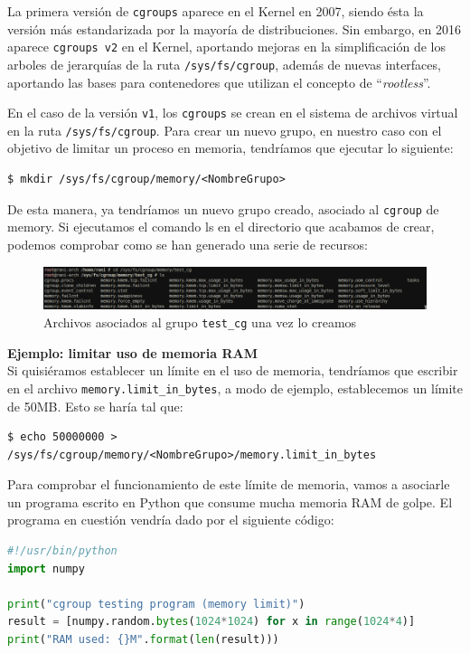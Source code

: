 \documentclass[a4paper, oneside, 12pt]{book}
\begin{document}
	\noindent La primera versión de \texttt{cgroups} aparece en el Kernel en 2007, siendo ésta la versión más estandarizada por la mayoría de distribuciones. Sin embargo, en 2016 aparece \texttt{cgroups v2} en el Kernel, aportando mejoras en la simplificación de los arboles de jerarquías de la ruta \texttt{/sys/fs/cgroup}, además de nuevas interfaces, aportando las bases para contenedores que utilizan el concepto de ``\textit{rootless}''. \\
	
	\par \noindent En el caso de la versión \texttt{v1}, los \texttt{cgroups} se crean en el sistema de archivos virtual en la ruta \texttt{/sys/fs/cgroup}. Para crear un nuevo grupo, en nuestro caso con el objetivo de limitar un proceso en memoria, tendríamos que ejecutar lo siguiente:
	\begin{verbatim}
$ mkdir /sys/fs/cgroup/memory/<NombreGrupo>
	\end{verbatim}

	\noindent De esta manera, ya tendríamos un nuevo grupo creado, asociado al \texttt{cgroup} de memory. Si ejecutamos el comando ls en el directorio que acabamos de crear, podemos comprobar como se han generado una serie de recursos: 
	
	\begin{figure}[h!]
		\begin{center}
			\includegraphics[width=1\textwidth]{img/cgroup_memory_ls.png}
			\caption{Archivos asociados al grupo \texttt{test\_cg} una vez lo creamos}
		\end{center}
	\end{figure}

	\pagebreak
	
	\noindent \textbf{\large Ejemplo: limitar uso de memoria RAM}\\
	
	\noindent Si quisiéramos establecer un límite en el uso de memoria, tendríamos que escribir en el archivo \texttt{memory.limit\_in\_bytes}, a modo de ejemplo, establecemos un límite de 50MB. Esto se haría tal que:
	\begin{verbatim}
$ echo 50000000 > /sys/fs/cgroup/memory/<NombreGrupo>/memory.limit_in_bytes
	\end{verbatim}

	\noindent Para comprobar el funcionamiento de este límite de memoria, vamos a asociarle un programa escrito en Python que consume mucha memoria RAM de golpe. El programa en cuestión vendría dado por el siguiente código:
	\begin{lstlisting}[language=Python, caption={Programa en Python que consume 4 GB de RAM}]
#!/usr/bin/python
import numpy

print("cgroup testing program (memory limit)")
result = [numpy.random.bytes(1024*1024) for x in range(1024*4)]
print("RAM used: {}M".format(len(result)))
	\end{lstlisting}
\end{document}

